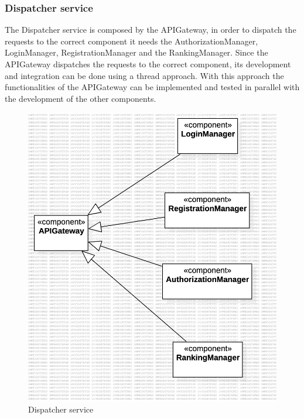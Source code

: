 \subsubsection*{Dispatcher service}
The Dispatcher service is composed by the APIGateway, in order to dispatch the requests to the correct component it needs the AuthorizationManager, LoginManager, RegistrationManager and the RankingManager.
Since the APIGateway dispatches the requests to the correct component, its development and integration can be done using a thread approach. With this approach the functionalities of the APIGateway can be implemented and tested in parallel with the development of the other components.
\begin{figure}[H]
    \centering
    \includegraphics[width=\textwidth]{Diagrams/DispatcherIntegrationPlan.jpg}
    \caption{Dispatcher service}
    \label{fig:dispatcher}
\end{figure}

